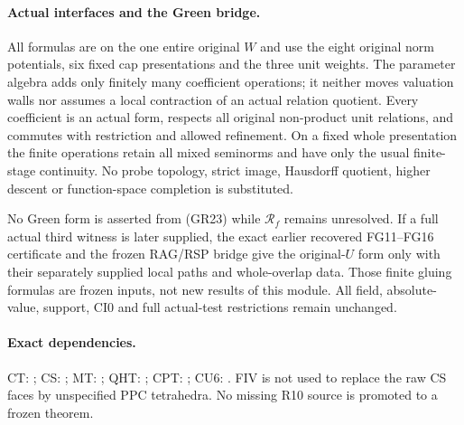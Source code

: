 \paragraph{Actual interfaces and the Green bridge.}
All formulas are on the one entire original $W$ and use the eight
original norm potentials, six fixed cap presentations and the three
unit weights.  The parameter algebra adds only finitely many
coefficient operations; it neither moves valuation walls nor assumes
a local contraction of an actual relation quotient.  Every coefficient
is an actual form, respects all original non-product unit relations,
and commutes with restriction and allowed refinement.  On a fixed
whole presentation the finite operations retain all mixed seminorms
and have only the usual finite-stage continuity.  No probe topology,
strict image, Hausdorff quotient, higher descent or function-space
completion is substituted.

No Green form is asserted from (GR23) while $\mathcal R_f$ remains
unresolved.  If a full actual third witness is later supplied, the
exact earlier recovered FG11--FG16 certificate and the frozen
RAG/RSP bridge give the original-$U$ form only with their separately
supplied local paths and whole-overlap data.  Those finite gluing
formulas are frozen inputs, not new results of this module.  All
field, absolute-value, support, CI0 and full actual-test restrictions
remain unchanged.

\paragraph{Exact dependencies.}
CT: ;
CS: ;
MT: ;
QHT: ;
CPT: ;
CU6: .
FIV is not used to replace the raw CS faces by unspecified PPC
tetrahedra.  No missing R10 source is promoted to a frozen theorem.

